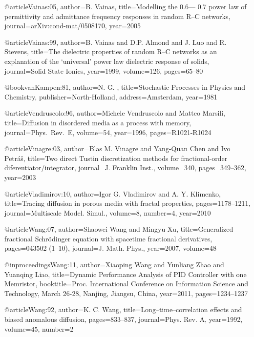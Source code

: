 \begin{thebibliography}{99}
@article{Vainas:05,
  author={B. Vainas},
  title={Modelling the {0.6--- 0.7} power law of permittivity and admittance frequency
    responses in random {R--C} networks},
  journal={arXiv:cond-mat/0508170},
  year={2005}
}

@article{Vainas:99,
  author={B. Vainas and D.P. Almond and J. Luo and R. Stevens},
  title={The dielectric properties of random {R--C} networks as an explanation
    of the `universal' power law dielectric response of solids},
  journal={Solid State Ionics},
  year={1999},
  volume={126},
  pages={65--80}
}

@book{vanKampen:81,
  author={N. G. },
  title={Stochastic Processes in Physics and Chemistry},
  publisher={North-Holland},
  address={Amsterdam},
  year={1981}
}

@article{Vendruscolo:96,
  author={Michele Vendruscolo and Matteo Marsili},
  title={Diffusion in disordered media as a process with memory},
  journal={Phys.\ Rev.\ E},
  volume={54},
  year={1996},
  pages={R1021-R1024}
}

@article{Vinagre:03,
  author={Blas M. Vinagre and Yang-Quan Chen and Ivo Petr{\'{a}}{\v{s}}},
  title={Two direct {T}ustin discretization methods for fractional{-}order diferentiator{/}integrator},
  journal={J. Franklin Inst.},
  volume={340},
  pages={349--362},
  year={2003}
}

@article{Vladimirov:10,
  author={Igor G. Vladimirov and A. Y. Klimenko},
  title={Tracing diffusion in porous media with fractal properties},
  pages={1178--1211},
  journal={Multiscale Model. Simul.},
  volume={8},
  number={4},
  year={2010}
}

@article{Wang:07,
  author={Shaowei Wang and Mingyu Xu},
  title={Generalized fractional {S}chr\"{o}dinger equation with spacetime fractional
    derivatives},
  pages={043502 (1--10)},
  journal={J. Math. Phys.},
  year={2007},
  volume={48}
}

@inproceedings{Wang:11,
  author={Xiaoping Wang and Yunliang Zhao and Yuanqing Liao},
  title={Dynamic Performance Analysis of {PID} Controller with one {M}emristor},
  booktitle={Proc. International Conference on Information Science and Technology,
    March 26-28, Nanjing, Jiangsu, China},
  year={2011},
  pages={1234--1237}
}

@article{Wang:92,
  author={K. C. Wang},
  title={Long--time--correlation effects and biased anomalous diffusion},
  pages={833--837},
  journal={Phys. Rev. A},
  year={1992},
  volume={45},
  number={2}
}


\end{thebibliography}
